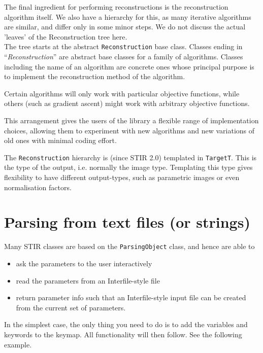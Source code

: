\documentclass{article}
\begin{document}
The final ingredient for performing reconstructions is the reconstruction 
algorithm itself. We also have a hierarchy for this, as many 
iterative algorithms are similar, and differ only in some minor 
steps. We do not discuss the actual 'leaves' of the Reconstruction 
tree here.
\\
The tree starts at the abstract \texttt{Reconstruction} base class. Classes 
ending in ``\textit{Reconstruction}'' are abstract base classes for 
a family of algorithms. Classes including the name of an algorithm 
are concrete ones whose principal purpose is to implement the 
reconstruction method of the algorithm. 

Certain algorithms will only work with particular objective functions,
while others (such as gradient ascent) might work with arbitrary
objective functions.

This arrangement gives the users 
of the library a flexible range of implementation choices, allowing 
them to experiment with new algorithms and new variations of 
old ones with minimal coding effort.

The \texttt{Reconstruction} hierarchy is (since STIR 2.0) templated in 
\texttt{TargetT}. This is the type of the output, i.e. normally
the image type. Templating this type gives flexibility to have
different output-types, such as parametric images or even 
normalisation factors.

\section{
Parsing from text files (or strings)\label{sect:parsing}}
Many STIR classes are based on the \texttt{ParsingObject} class, and hence 
are able to
\begin{itemize}
\item 
ask the parameters to the user interactively
\item 
read the parameters from an Interfile-style file
\item 
return parameter info such that an Interfile-style input file 
can be created from the current set of parameters.
\end{itemize}

In the simplest case, the only thing you need to do is to add the variables
and keywords to the keymap. All functionality will then follow. See the
following example.
\end{document}
